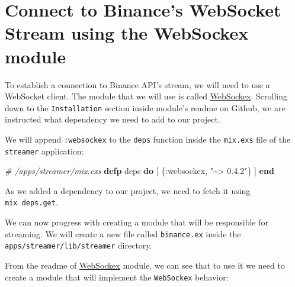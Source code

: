 \documentclass[
  oneside]{book}
\newenvironment{Shaded}{\begin{snugshade}}{\end{snugshade}}
\newcommand{\CommentTok}[1]{\textcolor[rgb]{0.56,0.35,0.01}{\textit{#1}}}
\newcommand{\KeywordTok}[1]{\textcolor[rgb]{0.13,0.29,0.53}{\textbf{#1}}}
\newcommand{\NormalTok}[1]{#1}
\newcommand{\StringTok}[1]{\textcolor[rgb]{0.31,0.60,0.02}{#1}}
\newcommand{\VariableTok}[1]{\textcolor[rgb]{0.00,0.00,0.00}{#1}}
\begin{document}
\hypertarget{connect-to-binances-websocket-stream-using-the-websockex-module}{%
\section{Connect to Binance's WebSocket Stream using the WebSockex module}\label{connect-to-binances-websocket-stream-using-the-websockex-module}}

To establish a connection to Binance API's stream, we will need to use a WebSocket client. The module that we will use is called \href{https://github.com/Azolo/websockex}{WebSockex}. Scrolling down to the \texttt{Installation} section inside module's readme on Github, we are instructed what dependency we need to add to our project.

We will append \texttt{:websockex} to the \texttt{deps} function inside the \texttt{mix.exs} file of the \texttt{streamer} application:

\begin{Shaded}
\begin{Highlighting}[]
  \CommentTok{\# /apps/streamer/mix.exs}
  \KeywordTok{defp}\NormalTok{ deps }\KeywordTok{do}
\NormalTok{    [}
\NormalTok{      \{}\VariableTok{:websockex}\NormalTok{, }\StringTok{"\textasciitilde{}\textgreater{} 0.4.2"}\NormalTok{\}}
\NormalTok{    ]}
  \KeywordTok{end}
\end{Highlighting}
\end{Shaded}

As we added a dependency to our project, we need to fetch it using \texttt{mix\ deps.get}.

We can now progress with creating a module that will be responsible for streaming. We will create a new file called \texttt{binance.ex} inside the \texttt{apps/streamer/lib/streamer} directory.

From the readme of \href{https://github.com/Azolo/websockex}{WebSockex} module, we can see that to use it we need to create a module that will implement the \texttt{WebSockex} behavior:
\end{document}
